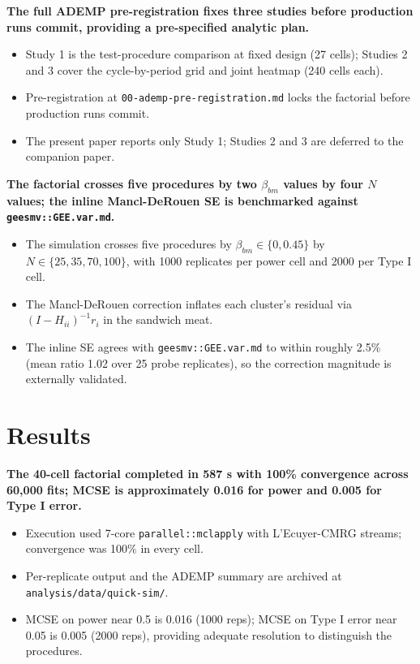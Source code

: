 \documentclass[
  11pt,
]{article}
\begin{document}
\textbf{The full ADEMP pre-registration fixes three studies before production runs commit, providing a pre-specified analytic plan.}

\begin{itemize}\setlength{\itemsep}{2pt}\setlength{\parskip}{0pt}
\item Study 1 is the test-procedure comparison at fixed design (27 cells); Studies 2 and 3 cover the cycle-by-period grid and joint heatmap (240 cells each).
\item Pre-registration at \texttt{00-ademp-pre-registration.md} locks the factorial before production runs commit.
\item The present paper reports only Study 1; Studies 2 and 3 are deferred to the companion paper.
\end{itemize}

\textbf{The factorial crosses five procedures by two $\beta_{bm}$ values by four $N$ values; the inline Mancl-DeRouen SE is benchmarked against \texttt{geesmv::GEE.var.md}.}

\begin{itemize}\setlength{\itemsep}{2pt}\setlength{\parskip}{0pt}
\item The simulation crosses five procedures by $\beta_{bm} \in \{0, 0.45\}$ by $N \in \{25, 35, 70, 100\}$, with 1000 replicates per power cell and 2000 per Type I cell.
\item The Mancl-DeRouen correction inflates each cluster's residual via $(I - H_{ii})^{-1}r_i$ in the sandwich meat.
\item The inline SE agrees with \texttt{geesmv::GEE.var.md} to within roughly 2.5\% (mean ratio 1.02 over 25 probe replicates), so the correction magnitude is externally validated.
\end{itemize}

\section{Results}\label{results}

\textbf{The 40-cell factorial completed in 587 s with 100\% convergence across 60{,}000 fits; MCSE is approximately 0.016 for power and 0.005 for Type I error.}

\begin{itemize}\setlength{\itemsep}{2pt}\setlength{\parskip}{0pt}
\item Execution used 7-core \texttt{parallel::mclapply} with L'Ecuyer-CMRG streams; convergence was 100\% in every cell.
\item Per-replicate output and the ADEMP summary are archived at \texttt{analysis/data/quick-sim/}.
\item MCSE on power near 0.5 is 0.016 (1000 reps); MCSE on Type I error near 0.05 is 0.005 (2000 reps), providing adequate resolution to distinguish the procedures.
\end{itemize}
\end{document}
